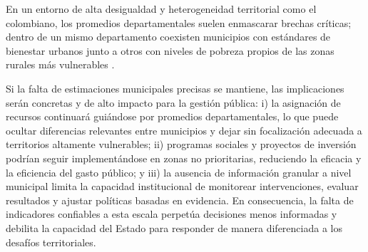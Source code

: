 En un entorno de alta desigualdad y heterogeneidad territorial como el colombiano, los promedios departamentales suelen enmascarar brechas críticas; dentro de un mismo departamento coexisten municipios con estándares de bienestar urbanos junto a otros con niveles de pobreza propios de las zonas rurales más vulnerables \cite{CEPAL_PanoramaSocial_2023}.

Si la falta de estimaciones municipales precisas se mantiene, las implicaciones serán concretas y de alto impacto para la gestión pública: i) la asignación de recursos continuará guiándose por promedios departamentales, lo que puede ocultar diferencias relevantes entre municipios y dejar sin focalización adecuada a territorios altamente vulnerables; ii) programas sociales y proyectos de inversión podrían seguir implementándose en zonas no prioritarias, reduciendo la eficacia y la eficiencia del gasto público; y iii) la ausencia de información granular a nivel municipal limita la capacidad institucional de monitorear intervenciones, evaluar resultados y ajustar políticas basadas en evidencia. En consecuencia, la falta de indicadores confiables a esta escala perpetúa decisiones menos informadas y debilita la capacidad del Estado para responder de manera diferenciada a los desafíos territoriales.
